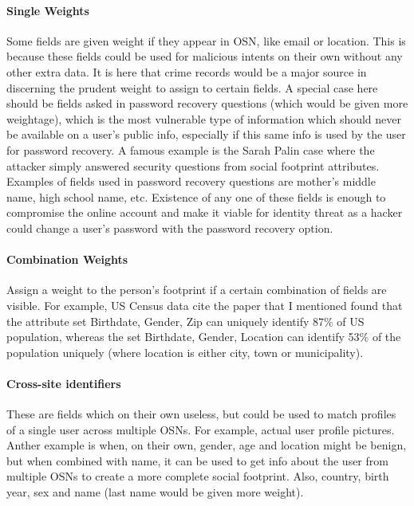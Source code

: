 \documentclass[12pt,conference]{IEEEtran}
\begin{document}
\paragraph*{Single Weights}  Some fields are given weight if they appear in OSN, like email or location. This is because these fields could be used for malicious intents on their own without any other extra data. It is here that crime records would be a major source in discerning the prudent weight to assign to certain fields. A special case here should be fields asked in password recovery questions (which would be given more weightage), which is the most vulnerable type of information which should never be available on a user’s public info, especially if this same info is used by the user for password recovery. A famous example is the Sarah Palin case where the attacker simply answered security questions from social footprint attributes. Examples of fields used in password recovery questions are mother’s middle name, high school name, etc. Existence of any one of these fields is enough to compromise the online account and make it viable for identity threat as a hacker could change a user’s password with the password recovery option.
\paragraph*{Combination Weights}  Assign a weight to the person’s footprint if a certain combination of fields are visible. For example, US Census data {cite the paper that I mentioned} found that the attribute set {Birthdate, Gender, Zip} can uniquely identify 87\% of US population, whereas the set {Birthdate, Gender, Location} can identify 53\% of the population uniquely (where location is either city, town or municipality).
\paragraph*{Cross-site identifiers}  These are fields which on their own useless, but could be used to match profiles of a single user across multiple OSNs. For example, actual user profile pictures. Anther example is when, on their own, gender, age and location might be benign, but when combined with name, it can be used to get info about the user from multiple OSNs to create a more complete social footprint. Also, country, birth year, sex and name (last name would be given more weight).
\end{document}
